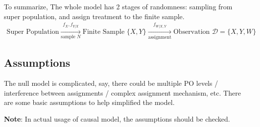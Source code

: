     To summarize, The whole model has 2 stages of randomness: sampling from super population, and assign treatment to the finite sample.
\begin{align}
    \text{Super Population}\xrightarrow[\text{sample }N]{f_{X}, f_{Y|X}}\text{Finite Sample }\{X,Y\}\xrightarrow[\text{assignment}]{f_{W|X,Y}}\text{Observation }\mathcal{D}=\{X,Y,W\}
\end{align}


\subsection{Assumptions}

The null model is complicated, say, there could be multiple PO levels / interference between assignments / complex assignment mechanism, etc. There are some basic assumptions to help simplified the model.

\textbf{Note}: In actual usage of causal model, the assumptions should be checked.  


